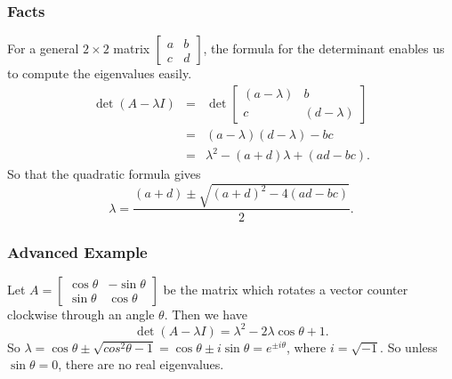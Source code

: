 \begin{frame}[fragile]\frametitle{Facts}

For a general $2\times 2$ matrix $\left[ \begin{array}{rrrrr} a & b \\ c & d \end{array} \right]$, 
the formula for the determinant enables us to compute the eigenvalues easily.
\begin{eqnarray*}
\det (A-\lambda I) &=&  
 \det \left[ \begin{array}{cc} (a-\lambda) & b \\ c & (d-\lambda) \end{array} \right]  \\
&=&    (a-\lambda)(d-\lambda) -bc  \\ &=& \lambda^2 - (a+d)\lambda + (ad-bc).
\end{eqnarray*}  
So that the quadratic formula gives   
\[
 \lambda = \frac{(a+d) \pm \sqrt{(a+d)^2 -4(ad-bc)} }{2}.
\]

\end{frame}

\begin{frame}[fragile]\frametitle{Advanced Example}

Let  $A = \left[ \begin{array}{rrrrr} \cos \theta & -\sin \theta \\ \sin \theta & \cos \theta \end{array} \right]$
be the matrix which rotates a vector counter clockwise through an angle $\theta$.  Then we have
\[
 \det(A-\lambda I) = \lambda^2 - 2 \lambda \cos \theta + 1.
\]
So $\lambda = \cos \theta \pm \sqrt{cos^2\theta-1} = \cos \theta \pm i \sin\theta = e^{\pm i\theta}$, where
$i = \sqrt{-1}$.  So unless $\sin \theta =0$, there are no real eigenvalues.


\end{frame}


  
